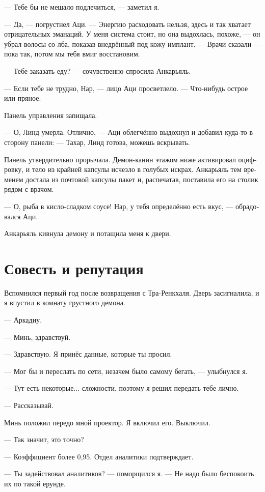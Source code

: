 \documentclass[a4paper,12pt,fleqn]{book}\usepackage{polyglossia}\setdefaultlanguage[babelshorthands=true]{russian}\setotherlanguage{english}\defaultfontfeatures{Ligatures=TeX,Mapping=tex-text}\usepackage{xcolor}\newcommand{\ml}[3]{#2}
\begin{document}
{--- Тебе бы не мешало подлечиться, --- заметил я.

--- Да, --- погрустнел Аци.
--- Энергию расходовать нельзя, здесь и так хватает отрицательных эманаций.
У меня система стоит, но она выдохлась, похоже, --- он убрал волосы со лба, показав внедрённый под кожу имплант.
--- Врачи сказали --- пока так, потом мы тебя вмиг восстановим.

--- Тебе заказать еду? --- сочувственно спросила Анкарьяль.

--- Если тебе не трудно, Нар, --- лицо Аци просветлело.
--- Что-нибудь острое или пряное.

Панель управления запищала.

--- О, Линд умерла.
Отлично, --- Аци облегчённо выдохнул и добавил куда-то в сторону панели:
--- Тахар, Линд готова, можешь вскрывать.

Панель утвердительно прорычала.
Демон-канин этажом ниже активировал оцифровку, и тело из крайней капсулы исчезло в голубых искрах.
Анкарьяль тем временем достала из почтовой капсулы пакет и, распечатав, поставила его на столик рядом с врачом.

--- О, рыба в кисло-сладком соусе!
Нар, у тебя определённо есть вкус, --- обрадовался Аци.

Анкарьяль кивнула демону и потащила меня к двери.

\section{Совесть и репутация}

Вспомнился первый год после возвращения с Тра-Ренкхаля.
Дверь засигналила, и я впустил в комнату грустного демона.

--- Аркадиу.

--- Минь, здравствуй.

--- Здравствую.
Я принёс данные, которые ты просил.

--- Мог бы и переслать по сети, незачем было самому бегать, --- улыбнулся я.

--- Тут есть некоторые... сложности, поэтому я решил передать тебе лично.

--- Рассказывай.

Минь положил передо мной проектор.
Я включил его.
Выключил.

--- Так значит, это точно?

--- Коэффициент более 0,95.
Отдел аналитики подтверждает.

--- Ты задействовал аналитиков? --- поморщился я.
--- Не надо было беспокоить их по такой ерунде.

}
\end{document}

